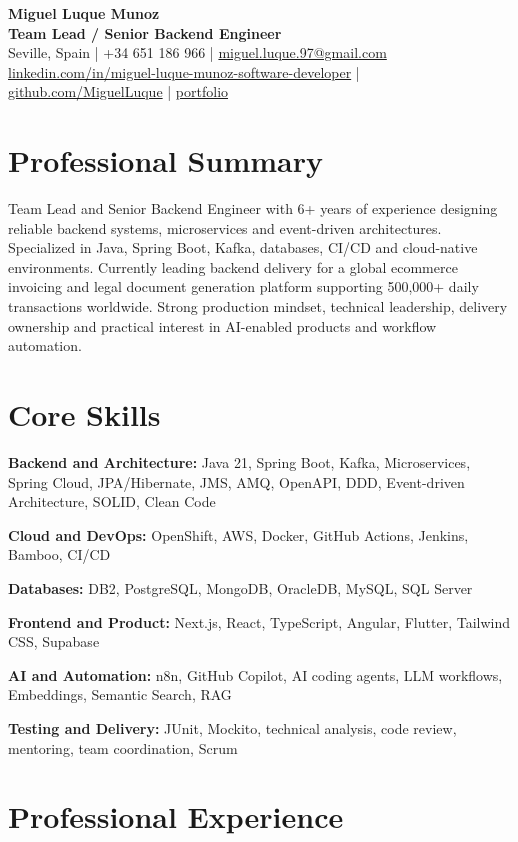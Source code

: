 \documentclass[10.5pt,a4paper]{article}
\newcommand{\cvheader}[5]{
  {\fontsize{27}{30}\selectfont\bfseries #1}\\[-1pt]
  {\Large\color{accent}\bfseries #2}\\[6pt]
  {\small #3 \quad | \quad #4 \quad | \quad \href{mailto:#5}{#5}}\\[3pt]
  {\small
    \href{https://linkedin.com/in/miguel-luque-munoz-software-developer}{linkedin.com/in/miguel-luque-munoz-software-developer}
    \quad | \quad
    \href{https://github.com/MiguelLuque}{github.com/MiguelLuque}
    \quad | \quad
    \href{https://portfolio-git-main-miguelluques-projects.vercel.app}{portfolio}
  }
}
\newcommand{\skill}[2]{
  {\small\textbf{\color{accent}#1:} #2}\par\vspace{3pt}
}
\begin{document}
\RaggedRight

\cvheader
  {Miguel Luque Munoz}
  {Team Lead / Senior Backend Engineer}
  {Seville, Spain}
  {+34 651 186 966}
  {miguel.luque.97@gmail.com}

\section{Professional Summary}
Team Lead and Senior Backend Engineer with 6+ years of experience designing reliable backend systems, microservices and event-driven architectures. Specialized in Java, Spring Boot, Kafka, databases, CI/CD and cloud-native environments. Currently leading backend delivery for a global ecommerce invoicing and legal document generation platform supporting 500,000+ daily transactions worldwide. Strong production mindset, technical leadership, delivery ownership and practical interest in AI-enabled products and workflow automation.

\section{Core Skills}
\skill{Backend and Architecture}{Java 21, Spring Boot, Kafka, Microservices, Spring Cloud, JPA/Hibernate, JMS, AMQ, OpenAPI, DDD, Event-driven Architecture, SOLID, Clean Code}
\skill{Cloud and DevOps}{OpenShift, AWS, Docker, GitHub Actions, Jenkins, Bamboo, CI/CD}
\skill{Databases}{DB2, PostgreSQL, MongoDB, OracleDB, MySQL, SQL Server}
\skill{Frontend and Product}{Next.js, React, TypeScript, Angular, Flutter, Tailwind CSS, Supabase}
\skill{AI and Automation}{n8n, GitHub Copilot, AI coding agents, LLM workflows, Embeddings, Semantic Search, RAG}
\skill{Testing and Delivery}{JUnit, Mockito, technical analysis, code review, mentoring, team coordination, Scrum}

\section{Professional Experience}
\end{document}
